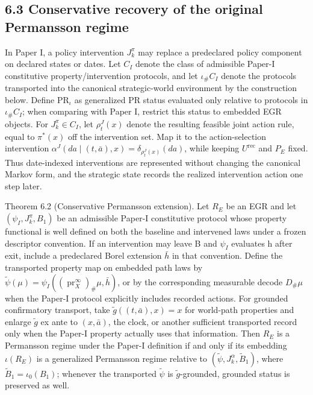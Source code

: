\documentclass[10pt]{article}
\newcommand{\push}{\mathord{\#}}
\begin{document}
\subsection{6.3 Conservative recovery of the original Permansson
regime}\label{conservative-recovery-of-the-original-permansson-regime}

In Paper I, a policy intervention \(J_k^\pi\) may replace a predeclared
policy component on declared states or dates. Let \(C_I\) denote the
class of admissible Paper-I constitutive property/intervention
protocols, and let \(\iota_{\push}C_I\) denote the protocols transported
into the canonical strategic-world environment by the construction
below. Define \(\mathrm{PR}_{\iota}\) as generalized PR status evaluated
only relative to protocols in \(\iota_{\push}C_I\); when comparing with
Paper I, restrict this status to embedded EGR objects. For
\(J_k^\pi\in{}C_I\), let \(\rho_t^J(x)\) denote the resulting feasible
joint action rule, equal to \(\pi^\ast(x)\) off the intervention set.
Map it to the action-selection intervention
\(\alpha^J(da\mid (t,\bar a),x)=\delta_{\rho_t^J(x)}(da)\), while
keeping \(U^{\mathrm{rec}}\) and \(P_E\) fixed. Thus date-indexed
interventions are represented without changing the canonical Markov
form, and the strategic state records the realized intervention action
one step later.

Theorem 6.2 (Conservative Permansson extension). Let \(R_E\) be an EGR
and let \((\psi_I,J_k^\pi,B_1)\) be an admissible Paper-I constitutive
protocol whose property functional is well defined on both the baseline
and intervened laws under a frozen descriptor convention. If an
intervention may leave B and \(\psi_I\) evaluates h after exit, include
a predeclared Borel extension \ensuremath{\bar h} in that convention. Define the
transported property map on embedded path laws by
\(\widetilde\psi(\mu)=\psi_I((\operatorname{pr}_X^\infty)_{\push}\mu,\bar h)\),
or by the corresponding measurable decode \(D_{\push}\mu\) when the
Paper-I protocol explicitly includes recorded actions. For grounded
confirmatory transport, take \(\widetilde g((t,\bar a),x)=x\) for
world-path properties and enlarge \ensuremath{\widetilde g} ex ante to \((x,\bar a)\), the
clock, or another sufficient transported record only when the Paper-I
property actually uses that information. Then \(R_E\) is a Permansson
regime under the Paper-I definition if and only if its embedding
\(\iota(R_E)\) is a generalized Permansson regime relative to
\((\widetilde\psi,J_k^\alpha,\widetilde B_1)\), where
\(\widetilde B_1=\iota_0(B_1)\); whenever the transported
\(\widetilde\psi\) is \ensuremath{\widetilde g}-grounded, grounded status is preserved as well.
\end{document}
